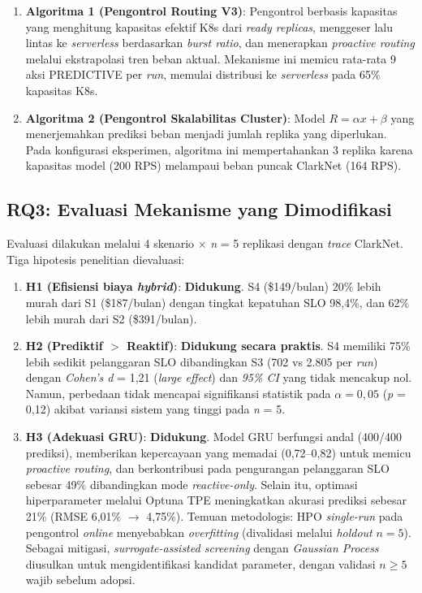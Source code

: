 \begin{enumerate}
    \item \textbf{Algoritma 1 (Pengontrol Routing V3)}: Pengontrol berbasis kapasitas yang menghitung kapasitas efektif K8s dari \emph{ready replicas}, menggeser lalu lintas ke \emph{serverless} berdasarkan \emph{burst ratio}, dan menerapkan \emph{proactive routing} melalui ekstrapolasi tren beban aktual. Mekanisme ini memicu rata-rata 9 aksi PREDICTIVE per \emph{run}, memulai distribusi ke \emph{serverless} pada 65\% kapasitas K8s.

    \item \textbf{Algoritma 2 (Pengontrol Skalabilitas Cluster)}: Model $R = \alpha x + \beta$ yang menerjemahkan prediksi beban menjadi jumlah replika yang diperlukan. Pada konfigurasi eksperimen, algoritma ini mempertahankan 3 replika karena kapasitas model (200 RPS) melampaui beban puncak ClarkNet (164 RPS).
\end{enumerate}

\subsection{RQ3: Evaluasi Mekanisme yang Dimodifikasi}

Evaluasi dilakukan melalui 4 skenario $\times$ \emph{n} = 5 replikasi dengan \emph{trace} ClarkNet. Tiga hipotesis penelitian dievaluasi:

\begin{enumerate}
    \item \textbf{H1 (Efisiensi biaya \emph{hybrid})}: \textbf{Didukung}. S4 (\$149/bulan) 20\% lebih murah dari S1 (\$187/bulan) dengan tingkat kepatuhan SLO 98,4\%, dan 62\% lebih murah dari S2 (\$391/bulan).

    \item \textbf{H2 (Prediktif $>$ Reaktif)}: \textbf{Didukung secara praktis}. S4 memiliki 75\% lebih sedikit pelanggaran SLO dibandingkan S3 (702 vs 2.805 per \emph{run}) dengan \emph{Cohen's d} = 1,21 (\emph{large effect}) dan \emph{95\% CI} yang tidak mencakup nol. Namun, perbedaan tidak mencapai signifikansi statistik pada $\alpha = 0,05$ (\emph{p} = 0,12) akibat variansi sistem yang tinggi pada \emph{n} = 5.

    \item \textbf{H3 (Adekuasi GRU)}: \textbf{Didukung}. Model GRU berfungsi andal (400/400 prediksi), memberikan kepercayaan yang memadai (0,72--0,82) untuk memicu \emph{proactive routing}, dan berkontribusi pada pengurangan pelanggaran SLO sebesar 49\% dibandingkan mode \emph{reactive-only}. Selain itu, optimasi hiperparameter melalui Optuna TPE meningkatkan akurasi prediksi sebesar 21\% (RMSE 6,01\% $\rightarrow$ 4,75\%). Temuan metodologis: HPO \emph{single-run} pada pengontrol \emph{online} menyebabkan \emph{overfitting} (divalidasi melalui \emph{holdout} $n=5$). Sebagai mitigasi, \emph{surrogate-assisted screening} dengan \emph{Gaussian Process} diusulkan untuk mengidentifikasi kandidat parameter, dengan validasi $n \geq 5$ wajib sebelum adopsi.
\end{enumerate}


